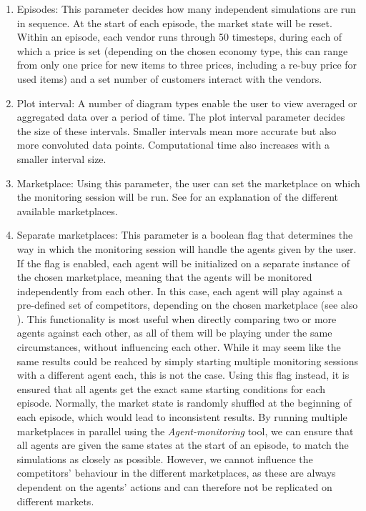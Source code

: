 \begin{enumerate}
	\item Episodes: This parameter decides how many independent simulations are run in sequence. At the start of each episode, the market state will be reset. Within an episode, each vendor runs through 50 timesteps, during each of which a price is set (depending on the chosen economy type, this can range from only one price for new items to three prices, including a re-buy price for used items) and a set number of customers interact with the vendors.
	\item Plot interval: A number of diagram types enable the user to view averaged or aggregated data over a period of time. The plot interval parameter decides the size of these intervals. Smaller intervals mean more accurate but also more convoluted data points. Computational time also increases with a smaller interval size.
	\item Marketplace: Using this parameter, the user can set the marketplace on which the monitoring session will be run. See  for an explanation of the different available marketplaces.
	\item Separate marketplaces: This parameter is a boolean flag that determines the way in which the monitoring session will handle the agents given by the user. If the flag is enabled, each agent will be initialized on a separate instance of the chosen marketplace, meaning that the agents will be monitored independently from each other. In this case, each agent will play against a pre-defined set of competitors, depending on the chosen marketplace (see also ). This functionality is most useful when directly comparing two or more agents against each other, as all of them will be playing under the same circumstances, without influencing each other. While it may seem like the same results could be reahced by simply starting multiple monitoring sessions with a different agent each, this is not the case. Using this flag instead, it is ensured that all agents get the exact same starting conditions for each episode. Normally, the market state is randomly shuffled at the beginning of each episode, which would lead to inconsistent results. By running multiple marketplaces in parallel using the \emph{Agent-monitoring} tool, we can ensure that all agents are given the same states at the start of an episode, to match the simulations as closely as possible. However, we cannot influence the competitors' behaviour in the different marketplaces, as these are always dependent on the agents' actions and can therefore not be replicated on different markets.


\end{enumerate}
